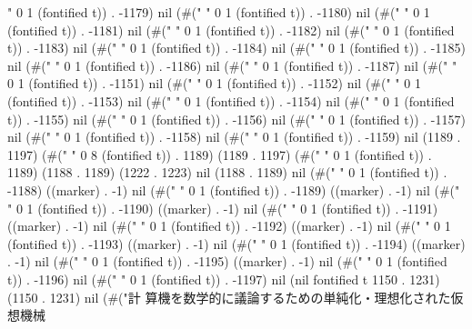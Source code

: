 " 0 1 (fontified t)) . -1179) nil (#("	" 0 1 (fontified t)) . -1180) nil (#("	" 0 1 (fontified t)) . -1181) nil (#(" " 0 1 (fontified t)) . -1182) nil (#(" " 0 1 (fontified t)) . -1183) nil (#(" " 0 1 (fontified t)) . -1184) nil (#(" " 0 1 (fontified t)) . -1185) nil (#(" " 0 1 (fontified t)) . -1186) nil (#(" " 0 1 (fontified t)) . -1187) nil (#("
" 0 1 (fontified t)) . -1151) nil (#("	" 0 1 (fontified t)) . -1152) nil (#(" " 0 1 (fontified t)) . -1153) nil (#(" " 0 1 (fontified t)) . -1154) nil (#(" " 0 1 (fontified t)) . -1155) nil (#(" " 0 1 (fontified t)) . -1156) nil (#(" " 0 1 (fontified t)) . -1157) nil (#(" " 0 1 (fontified t)) . -1158) nil (#(" " 0 1 (fontified t)) . -1159) nil (1189 . 1197) (#("	       " 0 8 (fontified t)) . 1189) (1189 . 1197) (#(" " 0 1 (fontified t)) . 1189) (1188 . 1189) (1222 . 1223) nil (1188 . 1189) nil (#("
" 0 1 (fontified t)) . -1188) ((marker) . -1) nil (#("	" 0 1 (fontified t)) . -1189) ((marker) . -1) nil (#(" " 0 1 (fontified t)) . -1190) ((marker) . -1) nil (#(" " 0 1 (fontified t)) . -1191) ((marker) . -1) nil (#(" " 0 1 (fontified t)) . -1192) ((marker) . -1) nil (#(" " 0 1 (fontified t)) . -1193) ((marker) . -1) nil (#(" " 0 1 (fontified t)) . -1194) ((marker) . -1) nil (#(" " 0 1 (fontified t)) . -1195) ((marker) . -1) nil (#(" " 0 1 (fontified t)) . -1196) nil (#(" " 0 1 (fontified t)) . -1197) nil (nil fontified t 1150 . 1231) (1150 . 1231) nil (#("計
	       算機を数学的に議論するための単純化・理想化された仮想機械
